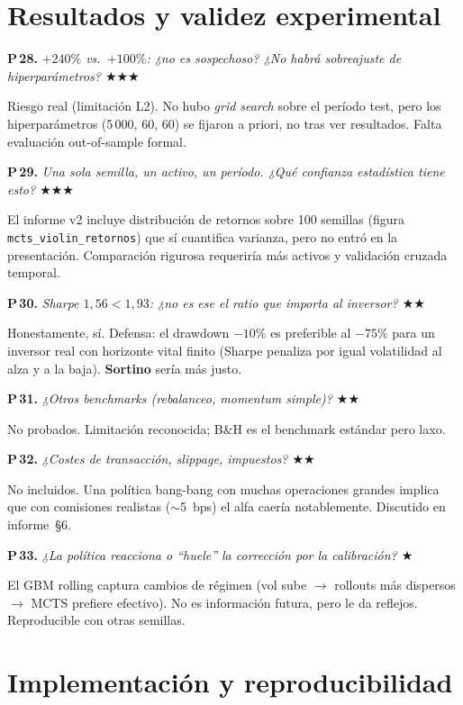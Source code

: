 \documentclass[11pt,a4paper]{article}
\newcommand{\preg}[2]{%
  \par\medskip
  \noindent\textbf{P\,#1.} \emph{#2}\par\smallskip}
\newcommand{\resp}[1]{%
  \noindent #1\par}
\begin{document}
\section{Resultados y validez experimental}

\preg{28}{$+240\%$ vs.\ $+100\%$: ¿no es sospechoso? ¿No habrá sobreajuste
de hiperparámetros? \hfill$\bigstar\bigstar\bigstar$}
\resp{%
Riesgo real (limitación L2). No hubo \emph{grid search} sobre el período
test, pero los hiperparámetros (5\,000, 60, 60) se fijaron a priori,
no tras ver resultados. Falta evaluación out-of-sample formal.}

\preg{29}{Una sola semilla, un activo, un período. ¿Qué confianza
estadística tiene esto? \hfill$\bigstar\bigstar\bigstar$}
\resp{%
El informe v2 incluye distribución de retornos sobre 100 semillas
(figura \texttt{mcts\_violin\_retornos}) que sí cuantifica varianza,
pero no entró en la presentación. Comparación rigurosa requeriría más
activos y validación cruzada temporal.}

\preg{30}{Sharpe $1{,}56 < 1{,}93$: ¿no es ese el ratio que importa al
inversor? \hfill$\bigstar\bigstar$}
\resp{%
Honestamente, sí. Defensa: el drawdown $-10\%$ es preferible al $-75\%$
para un inversor real con horizonte vital finito (Sharpe penaliza por
igual volatilidad al alza y a la baja). \textbf{Sortino} sería más justo.}

\preg{31}{¿Otros benchmarks (rebalanceo, momentum simple)?
\hfill$\bigstar\bigstar$}
\resp{%
No probados. Limitación reconocida; B\&H es el benchmark estándar pero
laxo.}

\preg{32}{¿Costes de transacción, slippage, impuestos? \hfill$\bigstar\bigstar$}
\resp{%
No incluidos. Una política bang-bang con muchas operaciones grandes
implica que con comisiones realistas ($\sim$5~bps) el alfa caería
notablemente. Discutido en informe~\S6.}

\preg{33}{¿La política reacciona o ``huele'' la corrección por la
calibración? \hfill$\bigstar$}
\resp{%
El GBM rolling captura cambios de régimen (vol sube $\to$ rollouts más
dispersos $\to$ MCTS prefiere efectivo). No es información futura, pero
le da reflejos. Reproducible con otras semillas.}

\section{Implementación y reproducibilidad}
\end{document}
